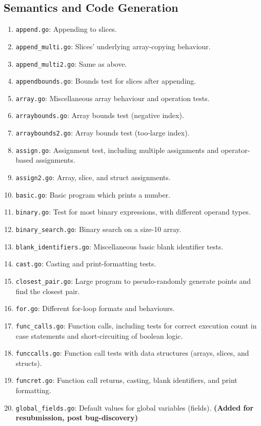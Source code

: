 \documentclass[11pt]{article}
\begin{document}
\subsection{Semantics and Code Generation}

\begin{enumerate}
\item \texttt{append.go}: Appending to slices.
\item \texttt{append\_multi.go}: Slices' underlying array-copying behaviour.
\item \texttt{append\_multi2.go}: Same as above.
\item \texttt{appendbounds.go}: Bounds test for slices after appending.
\item \texttt{array.go}: Miscellaneous array behaviour and operation tests.
\item \texttt{arraybounds.go}: Array bounds test (negative index).
\item \texttt{arraybounds2.go}: Array bounds test (too-large index).
\item \texttt{assign.go}: Assignment test, including multiple assignments and operator-based assignments.
\item \texttt{assign2.go}: Array, slice, and struct assignments.
\item \texttt{basic.go}: Basic program which prints a number.
\item \texttt{binary.go}: Test for most binary expressions, with different operand types.
\item \texttt{binary\_search.go}: Binary search on a size-10 array.
\item \texttt{blank\_identifiers.go}: Miscellaneous basic blank identifier tests.
\item \texttt{cast.go}: Casting and print-formatting tests.
\item \texttt{closest\_pair.go}: Large program to pseudo-randomly generate points and find the closest pair.
\item \texttt{for.go}: Different for-loop formats and behaviours.
\item \texttt{func\_calls.go}: Function calls, including tests for correct execution count in case statements and short-circuiting of boolean logic.
\item \texttt{funccalls.go}: Function call tests with data structures (arrays, slices, and structs).
\item \texttt{funcret.go}: Function call returns, casting, blank identifiers, and print formatting.
\item \texttt{global\_fields.go}: Default values for global variables (fields). \textbf{(Added for resubmission, post bug-discovery)}

\end{enumerate}
\end{document}
